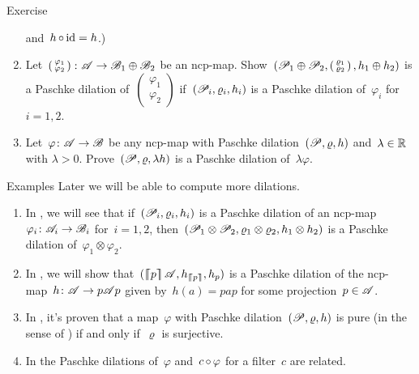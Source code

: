 \documentclass[b]{subfiles}
\begin{document}
\begin{parsec}
\begin{point}{Exercise}
\begin{enumerate}
and~$h \mathop{\circ} \operatorname{id} = h$.)
\item
    Let~$ \left(\begin{smallmatrix} \varphi_1 \\ \varphi_2
    \end{smallmatrix}\right) \colon \mathscr{A} \to \mathscr{B}_1 \oplus \mathscr{B}_2$
    be an ncp-map.
Show~$(\mathscr{P}_1 \oplus \mathscr{P}_2,
        \left(\begin{smallmatrix} \varrho_1 \\ \varrho_2 \end{smallmatrix}\right),
        h_1 \oplus h_2)$
        is a Paschke dilation of~$\left(\begin{smallmatrix} \varphi_1 \\ \varphi_2 
        \end{smallmatrix}\right)$
    if~$(\mathscr{P}_i, \varrho_i, h_i)$
    is a Paschke dilation of~$\varphi_i$ for~$i=1,2$.
\item
Let~$\varphi\colon \mathscr{A} \to \mathscr{B}$
    be any ncp-map with Paschke dilation~$(\mathscr{P}, \varrho, h)$
    and~$\lambda \in \mathbb{R}$ with $\lambda > 0$.
Prove~$(\mathscr{P}, \varrho, \lambda h)$
    is a Paschke dilation of~$\lambda \varphi$.
\end{enumerate}
\end{point}
\begin{point}{Examples}%
Later we will be able to compute more dilations.
\begin{enumerate}
\item
In , we will see
    that if~$(\mathscr{P}_i, \varrho_i, h_i)$
    is a Paschke dilation of an ncp-map~$\varphi_i \colon \mathscr{A}_i \to \mathscr{B}_i$
    for~$i=1,2$,
    then~$(\mathscr{P}_1 \otimes \mathscr{P}_2, \varrho_1\otimes \varrho_2, h_1\otimes h_2)$
    is a Paschke dilation of~$\varphi_1 \otimes \varphi_2$.
\item
In , we will
    show that~$(\cceil{p}\scrA, h_{\cceil{p}}, h_p)$
    is a Paschke dilation of the
    ncp-map~$h\colon \mathscr{A} \to p \mathscr{A} p$
    given by~$h(a) = pap$ for some projection~$p\in \mathscr{A}$.
\item
In , it's proven
    that a map~$\varphi$
    with Paschke dilation~$(\mathscr{P}, \varrho, h)$
    is pure (in the sense of )
    if and only if~$\varrho$ is surjective.
\item
In 
    the Paschke dilations of~$\varphi$
    and~$c \mathop{\circ} \varphi$ for a filter~$c$ are related.
\end{enumerate}
\end{point}
\end{parsec}
\end{document}

